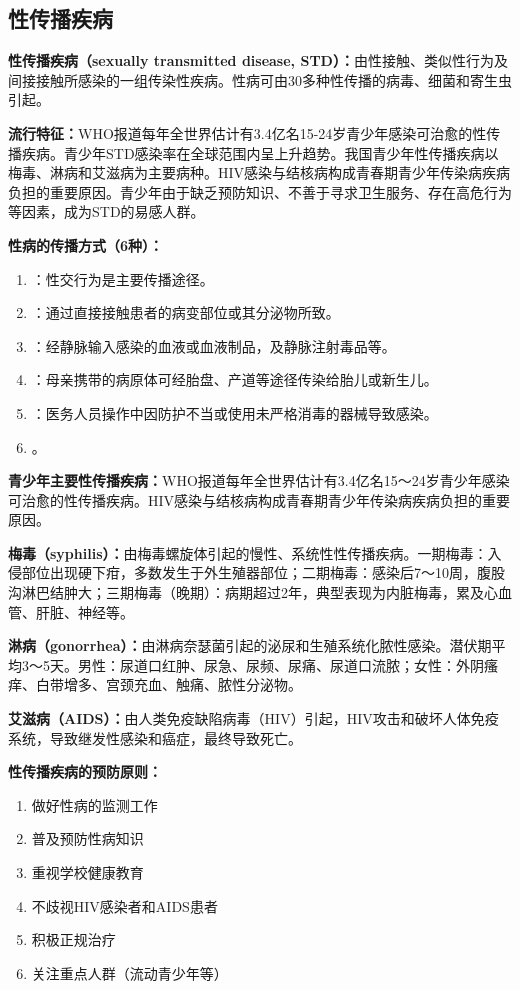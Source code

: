 \subsection{性传播疾病}

\begin{defbox}
\textbf{性传播疾病（sexually transmitted disease, STD）：}由性接触、类似性行为及间接接触所感染的一组传染性疾病。性病可由30多种性传播的病毒、细菌和寄生虫引起。
\end{defbox}

\begin{keybox}
\textbf{流行特征：}WHO报道每年全世界估计有3.4亿名15-24岁青少年感染可治愈的性传播疾病。青少年STD感染率在全球范围内呈上升趋势。我国青少年性传播疾病以梅毒、淋病和艾滋病为主要病种。HIV感染与结核病构成青春期青少年传染病疾病负担的重要原因。青少年由于缺乏预防知识、不善于寻求卫生服务、存在高危行为等因素，成为STD的易感人群。

\textbf{性病的传播方式（6种）：}
\begin{enumerate}[leftmargin=*]
    \item {}：性交行为是主要传播途径。
    \item {}：通过直接接触患者的病变部位或其分泌物所致。
    \item {}：经静脉输入感染的血液或血液制品，及静脉注射毒品等。
    \item {}：母亲携带的病原体可经胎盘、产道等途径传染给胎儿或新生儿。
    \item {}：医务人员操作中因防护不当或使用未严格消毒的器械导致感染。
    \item {}。
\end{enumerate}

\textbf{青少年主要性传播疾病：}WHO报道每年全世界估计有3.4亿名15～24岁青少年感染可治愈的性传播疾病。HIV感染与结核病构成青春期青少年传染病疾病负担的重要原因。

\textbf{梅毒（syphilis）：}由梅毒螺旋体引起的慢性、系统性性传播疾病。一期梅毒：入侵部位出现硬下疳，多数发生于外生殖器部位；二期梅毒：感染后7～10周，腹股沟淋巴结肿大；三期梅毒（晚期）：病期超过2年，典型表现为内脏梅毒，累及心血管、肝脏、神经等。

\textbf{淋病（gonorrhea）：}由淋病奈瑟菌引起的泌尿和生殖系统化脓性感染。潜伏期平均3～5天。男性：尿道口红肿、尿急、尿频、尿痛、尿道口流脓；女性：外阴瘙痒、白带增多、宫颈充血、触痛、脓性分泌物。

\textbf{艾滋病（AIDS）：}由人类免疫缺陷病毒（HIV）引起，HIV攻击和破坏人体免疫系统，导致继发性感染和癌症，最终导致死亡。

\textbf{性传播疾病的预防原则：}
\begin{enumerate}[leftmargin=*]
    \item 做好性病的监测工作
    \item 普及预防性病知识
    \item 重视学校健康教育
    \item 不歧视HIV感染者和AIDS患者
    \item 积极正规治疗
    \item 关注重点人群（流动青少年等）
\end{enumerate}
\end{keybox}

